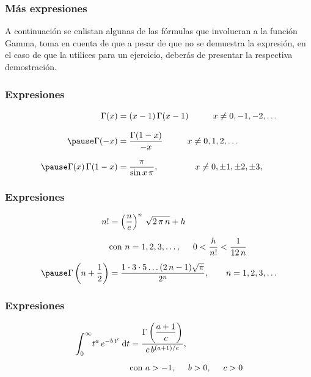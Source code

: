 \documentclass[12pt]{beamer}
\begin{document}
\begin{frame}
\frametitle{Más expresiones}
A continuación se enlistan algunas de las fórmulas que involucran a la función Gamma, \pause toma en cuenta de que a pesar de que no se demuestra la expresión, en el caso de que la utilices para un ejercicio, deberás de presentar la respectiva demostración.
\end{frame}
\begin{frame}
\frametitle{Expresiones}
{%
\begin{eqnarray*}
\begin{aligned}
\Gamma (x) &= (x - 1) \, \Gamma(x - 1) \hspace{1cm} x \neq 0, -1, -2, \ldots \\[0.75em] \pause
\Gamma (-x) &= \dfrac{\Gamma (1- x)}{-x} \hspace{1cm} x \neq 0, 1, 2, \ldots \\[0.75em] \pause
\Gamma (x) \, \Gamma (1 - x) &= \dfrac{\pi}{\sin x \, \pi}, \hspace{1.5cm} x \neq 0, \pm 1, \pm 2, \pm 3, \end{aligned}
\end{eqnarray*}
}
\end{frame}
\begin{frame}
\frametitle{Expresiones}
{%
\begin{eqnarray*}
\begin{aligned}
n! &= \left( \dfrac{n}{e} \right)^{n} \, \sqrt{2 \, \pi \, n} + h \\[0.5em]
&\mbox{con } n = 1, 2, 3, \ldots, \hspace{0.5cm} 0 < \dfrac{h}{n!} < \dfrac{1}{12 \, n} \\[0.5em] \pause
\Gamma \left(n + \dfrac{1}{2} \right) &= \dfrac{1 \cdot 3 \cdot 5 \ldots (2 \, n - 1)\sqrt{\pi}}{2^{n}}, \hspace{0.7cm} n = 1, 2, 3, \ldots
\end{aligned}
\end{eqnarray*}
}
\end{frame}
\begin{frame}
\frametitle{Expresiones}
{%
\begin{eqnarray*}
\begin{aligned}
\scaleint{6ex}_{\bs 0}^{\infty} t^{a} \, e^{-b \, t^{c}} \dd{t} &= \dfrac{\Gamma \left(\dfrac{a + 1}{c} \right)}{c \, b^{(a+1)/c}}, \\[0.5em]
&\mbox{con } a > -1, \hspace{0.5cm} b > 0, \hspace{0.5cm} c > 0   
\end{aligned}
\end{eqnarray*}
}
\end{frame}
\end{document}
